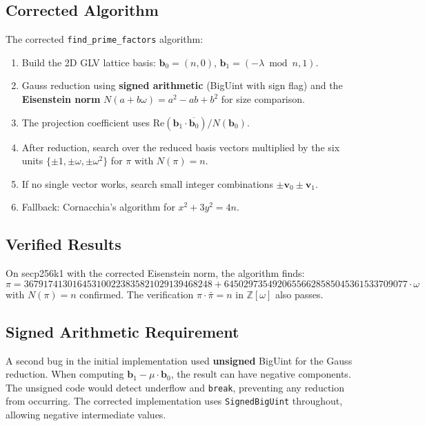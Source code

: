 \documentclass[11pt,a4paper]{article}
\theoremstyle{definition}
\newcommand{\Zomega}{\mathbb{Z}[\omega]}
\begin{document}
\subsection{Corrected Algorithm}

The corrected \texttt{find\_prime\_factors} algorithm:

\begin{enumerate}[leftmargin=2em]
    \item Build the 2D GLV lattice basis: $\mathbf{b}_0 = (n, 0)$, $\mathbf{b}_1 = (-\lambda \bmod n, 1)$.
    \item Gauss reduction using \textbf{signed arithmetic} (BigUint with sign flag) and the \textbf{Eisenstein norm} $N(a+b\omega) = a^2 - ab + b^2$ for size comparison.
    \item The projection coefficient uses $\text{Re}(\mathbf{b}_1 \cdot \overline{\mathbf{b}_0}) / N(\mathbf{b}_0)$.
    \item After reduction, search over the reduced basis vectors multiplied by the six units $\{\pm 1, \pm\omega, \pm\omega^2\}$ for $\pi$ with $N(\pi) = n$.
    \item If no single vector works, search small integer combinations $\pm\mathbf{v}_0 \pm \mathbf{v}_1$.
    \item Fallback: Cornacchia's algorithm for $x^2 + 3y^2 = 4n$.
\end{enumerate}

\subsection{Verified Results}

On secp256k1 with the corrected Eisenstein norm, the algorithm finds:
$$\pi = 367917413016453100223835821029139468248 + 64502973549206556628585045361533709077 \cdot \omega$$
with $N(\pi) = n$ confirmed. The verification $\pi \cdot \bar{\pi} = n$ in $\Zomega$ also passes.

\subsection{Signed Arithmetic Requirement}

A second bug in the initial implementation used \textbf{unsigned} BigUint for the Gauss reduction. When computing $\mathbf{b}_1 - \mu \cdot \mathbf{b}_0$, the result can have negative components. The unsigned code would detect underflow and \texttt{break}, preventing any reduction from occurring. The corrected implementation uses \texttt{SignedBigUint} throughout, allowing negative intermediate values.
\end{document}
